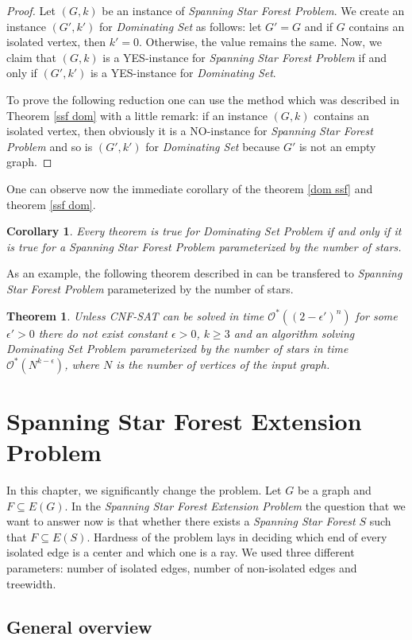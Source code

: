 \documentclass[en]{pracamgr}
\newtheorem{theorem}{Theorem}
\newtheorem{corollary}{Corollary}
\newcommand{\ssf}{\emph{Spanning Star Forest}}
\newcommand{\ssfp}{\emph{Spanning Star Forest Problem}}
\newcommand{\domset}{\emph{Dominating Set}}
\newcommand{\domsetp}{\emph{Dominating Set Problem}}
\newcommand{\kssf}{\emph{Spanning Star Forest Problem} parameterized by the number of stars}
\newcommand{\cnfsat}{\emph{CNF-SAT}}
\newcommand{\ssfe}{\emph{Spanning Star Forest Extension Problem}}
\begin{document}
\begin{proof}
	Let $(G,k)$ be an instance of \ssfp{}. We create an instance $(G',k')$ for \domset{} as follows: let $G'=G$ and if $G$ contains an isolated vertex, then $k'=0$. Otherwise, the value remains the same. Now, we claim that $(G,k)$ is a YES-instance for \ssfp{} if and only if $(G',k')$ is a YES-instance for \domset.
	
	To prove the following reduction one can use the method which was described in Theorem \ref{ssf dom} with a little remark: if an instance $(G,k)$ contains an isolated vertex, then obviously it is a NO-instance for \ssfp{} and so is $(G',k')$ for \domset{} because $G'$ is not an empty graph.
\end{proof}

One can observe now the immediate corollary of the theorem \ref{dom ssf} and theorem \ref{ssf dom}.

\begin{corollary}
	Every theorem is true for \domsetp{} if and only if it is true for a \kssf{}.
\end{corollary}

As an example, the following theorem described in 
can be transfered to \kssf{}.

\begin{theorem}
	Unless \cnfsat{} can be solved in time $\mathcal{O}^*((2-\epsilon')^n)$ for some $\epsilon' > 0$ there do not exist constant $\epsilon > 0$, $k \geq 3$ and an algorithm solving \domsetp{} parameterized by the number of stars in time $\mathcal{O}^*(N^{k-\epsilon})$, where $N$ is the number of vertices of the input graph. 
\end{theorem}

\chapter{Spanning Star Forest Extension Problem}

In this chapter, we significantly change the problem. Let $G$ be a graph and $F \subseteq E(G)$. In the \ssfe{} the question that we want to answer now is that whether there exists a \ssf{} $S$ such that $F \subseteq E(S)$. Hardness of the problem lays in deciding which end of every isolated edge is a center and which one is a ray. We used three different parameters: number of isolated edges, number of non-isolated edges and treewidth. 

\section{General overview}
\end{document}
